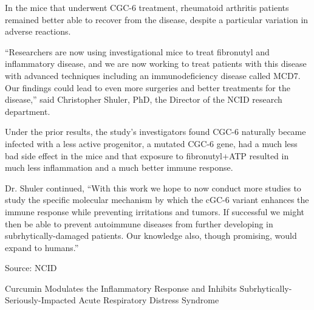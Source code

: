 \documentclass{article}
\begin{document}
In the mice that underwent CGC-6 treatment, rheumatoid arthritis patients remained better able to recover from the disease, despite a particular variation in adverse reactions.

“Researchers are now using investigational mice to treat fibronutyl and inflammatory disease, and we are now working to treat patients with this disease with advanced techniques including an immunodeficiency disease called MCD7. Our findings could lead to even more surgeries and better treatments for the disease,” said Christopher Shuler, PhD, the Director of the NCID research department.

Under the prior results, the study’s investigators found CGC-6 naturally became infected with a less active progenitor, a mutated CGC-6 gene, had a much less bad side effect in the mice and that exposure to fibronutyl+ATP resulted in much less inflammation and a much better immune response.

Dr. Shuler continued, “With this work we hope to now conduct more studies to study the specific molecular mechanism by which the cGC-6 variant enhances the immune response while preventing irritations and tumors. If successful we might then be able to prevent autoimmune diseases from further developing in subrhytically-damaged patients. Our knowledge also, though promising, would expand to humans.”

Source: NCID

Curcumin Modulates the Inflammatory Response and Inhibits Subrhytically-Seriously-Impacted Acute Respiratory Distress Syndrome
\end{document}
